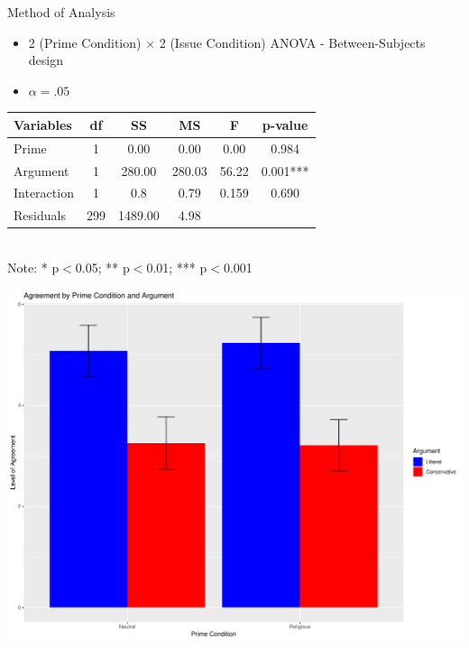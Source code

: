 \documentclass[landscape,a0paper,fontscale=0.285]{baposter} %
\newcommand{\compresslist}{ %
\setlength{\itemsep}{1pt}
\setlength{\parskip}{0pt}
\setlength{\parsep}{0pt}
}
\newcommand\tb{\textbf}
\begin{document}
\begin{poster}
{\begin{multicols}{2}
Method of Analysis

\begin{itemize} \compresslist
	\item 2 (Prime Condition) $\times$ 2 (Issue Condition) ANOVA - Between-Subjects design
	\item $\alpha = .05$
\end{itemize}
\end{multicols}


\begin{multicols}{2}
\vspace{1em}
\begin{table}[H]
	\centering
	\small
	\begin{tabular}{lccccc}
		\hline
		\tb{Variables}&\tb{df}&\tb{SS}&\tb{MS}&\tb{F}&\tb{p-value}\\
		\hline
		Prime&1&0.00&0.00&0.00&0.984\\
		Argument&1&280.00&280.03&56.22&0.001***\\
		Interaction&1&0.8&0.79&0.159&0.690\\
		Residuals&299&1489.00&4.98&&\\
		\hline
	\end{tabular}\\
	Note: * p$<$0.05; ** p$<$0.01; *** p$<$0.001
\end{table}

\begin{center}
\includegraphics[width=0.8\linewidth]{barplot}
\end{center}

\end{multicols}
}


\end{poster}
\end{document}
